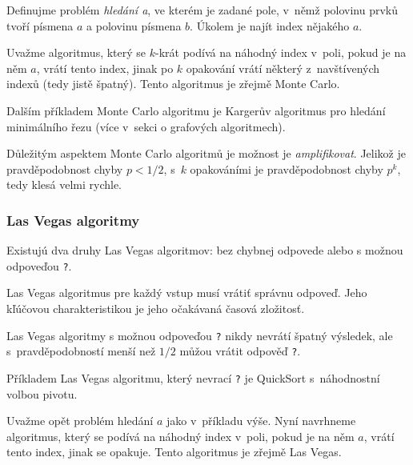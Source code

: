 
\begin{example}
    Definujme problém {\em hledání a}, ve kterém je zadané pole, v~němž
    polovinu prvků tvoří písmena $a$ a polovinu písmena $b$. Úkolem je
    najít index nějakého $a$.

    Uvažme algoritmus, který se $k$-krát podívá na náhodný index v~poli,
    pokud je na něm $a$, vrátí tento index, jinak po $k$ opakování vrátí
    některý z~navštívených indexů (tedy jistě špatný).
    Tento algoritmus je zřejmě Monte Carlo.
\end{example}

Dalším příkladem Monte Carlo algoritmu je Kargerův algoritmus pro
hledání minimálního řezu (více v~sekci o grafových algoritmech).

Důležitým aspektem Monte Carlo algoritmů je možnost je {\em
amplifikovat}. Jelikož je pravděpodobnost chyby $p < 1/2$, s~$k$
opakováními je pravděpodobnost chyby $p^k$, tedy klesá velmi rychle.


\subsubsection{Las Vegas algoritmy}

Existujú dva druhy Las Vegas algoritmov: bez chybnej odpovede alebo
s možnou odpoveďou \verb|?|.

Las Vegas algoritmus pre každý vstup musí vrátiť správnu odpoveď.
Jeho kľúčovou charakteristikou je jeho očakávaná časová zložitosť.

Las Vegas algoritmy s možnou odpoveďou \verb|?| nikdy nevrátí špatný výsledek, ale
s~pravděpodobností menší než $1/2$ můžou
vrátit odpověď \verb|?|. 

Příkladem Las Vegas algoritmu, který nevrací
\verb|?| je QuickSort s~náhodnostní volbou pivotu.

\begin{example}
    Uvažme opět problém hledání $a$ jako v~příkladu výše.
    Nyní navrhneme algoritmus, který se podívá na náhodný index v~poli,
    pokud je na něm $a$, vrátí tento index, jinak se opakuje.
    Tento algoritmus je zřejmě Las Vegas.
\end{example}

